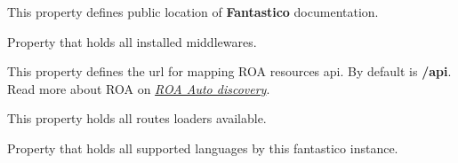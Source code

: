 \documentclass[letterpaper,10pt,english]{sphinxmanual}
\begin{document}
\begin{fulllineitems}
\begin{fulllineitems}
\end{fulllineitems}


\begin{fulllineitems}
\label{get_started/settings:fantastico.settings.BasicSettings.doc_base}
This property defines public location of \textbf{Fantastico} documentation.

\end{fulllineitems}


\begin{fulllineitems}
\label{get_started/settings:fantastico.settings.BasicSettings.installed_middleware}
Property that holds all installed middlewares.

\end{fulllineitems}


\begin{fulllineitems}
\label{get_started/settings:fantastico.settings.BasicSettings.roa_api}
This property defines the url for mapping ROA resources api. By default is \textbf{/api}. Read more about ROA on
{\hyperref[features/components/roa_discovery/roa_discovery::doc]{\emph{ROA Auto discovery}}}.

\end{fulllineitems}


\begin{fulllineitems}
\label{get_started/settings:fantastico.settings.BasicSettings.routes_loaders}
This property holds all routes loaders available.

\end{fulllineitems}


\begin{fulllineitems}
\label{get_started/settings:fantastico.settings.BasicSettings.supported_languages}
Property that holds all supported languages by this fantastico instance.


\end{fulllineitems}
\end{fulllineitems}
\end{document}
